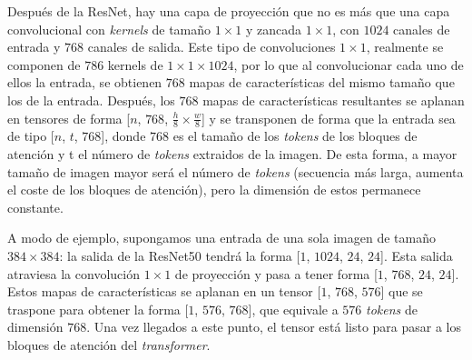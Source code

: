 Después de la ResNet, hay una capa de proyección que no es más que una capa convolucional con \textit{kernels} de tamaño $1\times1$ y zancada $1\times1$, con $1024$ canales de entrada y $768$ canales de salida. Este tipo de convoluciones $1\times1$, realmente se componen de $786$ kernels de $1\times1\times1024$, por lo que al convolucionar cada uno de ellos la entrada, se obtienen $768$ mapas de características del mismo tamaño que los de la entrada. Después, los $768$ mapas de características resultantes se aplanan en tensores de forma [$n$, $768$, $\frac{h}{8} \times \frac{w}{8}$] y se transponen de forma que la entrada sea de tipo [$n$, $t$, $768$], donde $768$ es el tamaño de los \textit{tokens} de los bloques de atención y t el número de \textit{tokens} extraidos de la imagen. De esta forma, a mayor tamaño de imagen mayor será el número de \textit{tokens} (secuencia más larga, aumenta el coste de los bloques de atención), pero la dimensión de estos permanece constante.

A modo de ejemplo, supongamos una entrada de una sola imagen de tamaño $384\times384$: la salida de la ResNet50 tendrá la forma [$1$, $1024$, $24$, $24$]. Esta salida atraviesa la convolución $1\times1$ de proyección y pasa a tener forma [$1$, $768$, $24$, $24$]. Estos mapas de características se aplanan en un tensor [$1$, $768$, $576$] que se traspone para obtener la forma [$1$, $576$, $768$], que equivale a $576$ \textit{tokens} de dimensión $768$. Una vez llegados a este punto, el tensor está listo para pasar a los bloques de atención del \textit{transformer}.

